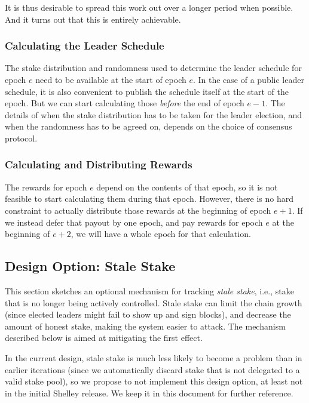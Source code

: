 \documentclass[11pt,a4paper]{article}
\begin{document}
It is thus desirable to spread this work out over a longer period when possible.
And it turns out that this is entirely achievable.

\subsubsection{Calculating the Leader Schedule}

The stake distribution and randomness used to determine the leader schedule for
epoch \(e\) need to be available at the start of epoch \(e\). In the case of a
public leader schedule, it is also convenient to publish the schedule itself at
the start of the epoch. But we can start calculating those \emph{before} the end
of epoch \(e-1\). The details of when the stake distribution has to be taken for
the leader election, and when the randomness has to be agreed on, depends on the
choice of consensus protocol.

\subsubsection{Calculating and Distributing Rewards}

The rewards for epoch \(e\) depend on the contents of that epoch, so it is not
feasible to start calculating them during that epoch. However, there is no hard
constraint to actually distribute those rewards at the beginning of epoch
\(e+1\). If we instead defer that payout by one epoch, and pay rewards for epoch
\(e\) at the beginning of \(e+2\), we will have a whole epoch for that
calculation.

\subsection{Design Option: Stale Stake}
\label{stale-stake}

This section sketches an optional mechanism for tracking \emph{stale
  stake}, i.e., stake that is no longer being actively
controlled. Stale stake can limit the chain growth (since elected
leaders might fail to show up and sign blocks), and decrease the
amount of honest stake, making the system easier to attack. The
mechanism described below is aimed at mitigating the first effect.

In the current design, stale stake is much less likely to become a
problem than in earlier iterations (since we automatically discard
stake that is not delegated to a valid stake pool), so we propose to
not implement this design option, at least not in the initial Shelley
release. We keep it in this document for further reference.
\end{document}
